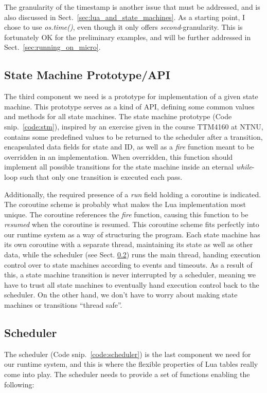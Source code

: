 \noindent
The granularity of the timestamp is another issue that must be addressed, and is also discussed in Sect.~\ref{sec:lua_and_state_machines}. As a starting point, I chose to use \emph{os.time()}, even though it only offers \emph{second}-granularity. This is fortunately OK for the preliminary examples, and will be further addressed in Sect.~\ref{sec:running_on_micro}.

\subsection{State Machine Prototype/API}
\label{sec:impl_stm}
The third component we need is a prototype for implementation of a given state machine. This prototype serves as a kind of API, defining some common values and methods for all state machines. The state machine prototype (Code snip.~\ref{code:stm}), inspired by an exercise given in the course TTM4160 at NTNU, contains some predefined values to be returned to the scheduler after a transition, encapsulated data fields for state and ID, as well as a \emph{fire} function meant to be overridden in an implementation. When overridden, this function should implement all possible transitions for the state machine inside an eternal \emph{while}-loop such that only one transition is executed each pass.

\noindent
Additionally, the required presence of a \emph{run} field holding a coroutine is indicated. The coroutine scheme is probably what makes the Lua implementation most unique. The coroutine references the \emph{fire} function, causing this function to be \emph{resumed} when the coroutine is resumed. This coroutine scheme fits perfectly into our runtime system as a way of structuring the program. Each state machine has its own coroutine with a separate thread, maintaining its state as well as other data, while the scheduler (see Sect. \ref{sec:impl_sched}) runs the main thread, handing execution control over to state machines according to events and timeouts. As a result of this, a state machine transition is never interrupted by a scheduler, meaning we have to trust all state machines to eventually hand execution control back to the scheduler. On the other hand, we don't have to worry about making state machines or transitions ``thread safe''.

\subsection{Scheduler}
\label{sec:impl_sched}
The scheduler (Code snip.~\ref{code:scheduler}) is the last component we need for our runtime system, and this is where the flexible properties of Lua tables really come into play. The scheduler needs to provide a set of functions enabling the following:

